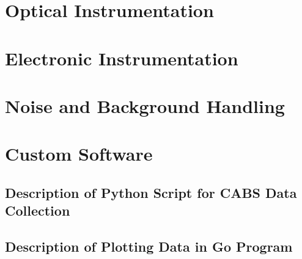 \section{Optical Instrumentation}
\label{sec:Experimental:Optical Instrumentation}
\lipsum[1]

\section{Electronic Instrumentation}
\label{sec:Experimental:Electronic Instrumentation}
\lipsum[1]

\section{Noise and Background Handling}
\label{sec:Experimental:Noise}
\lipsum[1]

\section{Custom Software}
\label{sec:Experimental:Software}
\lipsum[1]

  \subsection{Description of Python Script for CABS Data Collection}
  \label{subsec:Experimental:Software:Python}
  \lipsum[1]

  \subsection{Description of Plotting Data in Go Program}
  \label{subsec:Experimental:Software:Go}
  \lipsum[1]
